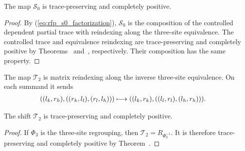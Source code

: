 \begin{lemma}
    \label{thm:mpdo_s0_map_cptp}
    \leanok
    The map $\mathcal S_0$ is trace-preserving and completely positive.
\end{lemma}
\begin{proof}
    \leanok

    By (\ref{eq:rfp_s0_factorization}), $\mathcal S_0$ is the composition of
    the controlled dependent partial trace with reindexing along the three-site
    equivalence. The controlled trace and equivalence reindexing are
    trace-preserving and completely positive by
    Theorems~\cite[``The controlled dependent partial trace is trace-preserving completely positive'']{QICLean2026Blueprint}
    and~\cite[``Equivalence reindexing is trace-preserving completely positive'']{QICLean2026Blueprint}, respectively. Their composition
    has the same property.
\end{proof}

\begin{definition}
    \label{def:mpdo_t2_map}
    \leanok
    The map $\mathcal T_2$ is matrix reindexing along the inverse three-site
    equivalence. On each summand it sends
    \begin{align}
        ((l_k,r_h),((r_k,l_l),(r_l,l_h)))
         & \longmapsto
        ((l_k,r_k),((l_l,r_l),(l_h,r_h))). \notag
    \end{align}
\end{definition}

\begin{lemma}
    \label{thm:mpdo_t2_map_cptp}
    \leanok
    The shift $\mathcal T_2$ is trace-preserving and completely positive.
\end{lemma}
\begin{proof}
    \leanok

    If $\Phi_3$ is the three-site regrouping, then
    $\mathcal T_2=R_{\Phi_3^{-1}}$. It is therefore trace-preserving and
    completely positive by Theorem~\cite[``Equivalence reindexing is trace-preserving completely positive'']{QICLean2026Blueprint}.
\end{proof}

